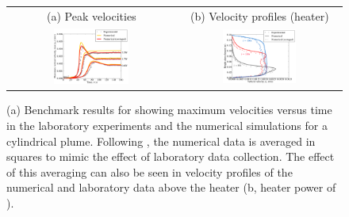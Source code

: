 \begin{figure}[htb]
\begin{tabular}{cc}
\footnotesize (a) Peak velocities & \footnotesize (b) Velocity profiles (\W[1.0] heater) \vspace{0.3cm} \\
\includegraphics[width=0.47\textwidth]{data/vatteville/max_velocity} & 
\includegraphics[width=0.47\textwidth]{data/vatteville/velocity_profile} \vspace{0.2cm} \\
\end{tabular}
\caption{(a) Benchmark results for \cite{VattevilleG32009} showing maximum velocities versus time in the laboratory experiments  and
the numerical simulations for a cylindrical plume.  Following \citet{VattevilleG32009}, the numerical data is averaged in \mm[3] squares to mimic the effect of laboratory data collection.  The effect of this averaging can also be seen in velocity profiles of the numerical 
and laboratory data above the heater (b, heater power of \W[1.0]).} 
\label{fig:vatteville}
\end{figure}



